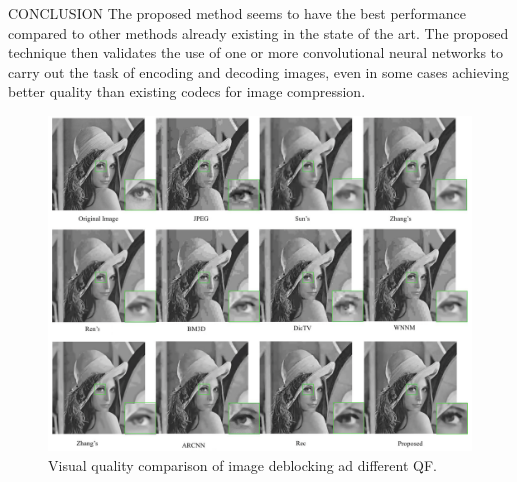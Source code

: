 \documentclass[10pt]{beamer}
\begin{document}
\begin{frame}{CONCLUSION}
    The proposed method seems to have the best performance compared to other 
    methods already existing in the state of the art. The proposed technique 
    then validates the use of one or more convolutional neural networks to carry 
    out the task of encoding and decoding images, even in some cases achieving 
    better quality than existing codecs for image compression.
    \begin{figure}[htbp]
        \centering
        \includegraphics[width = 0.5 \linewidth]{images/paper3/final.png}
        \centering
        \caption{Visual quality comparison of image deblocking ad different QF.}
        \label{fig:final comparison}
    \end{figure}
\end{frame}

    
\end{document}
